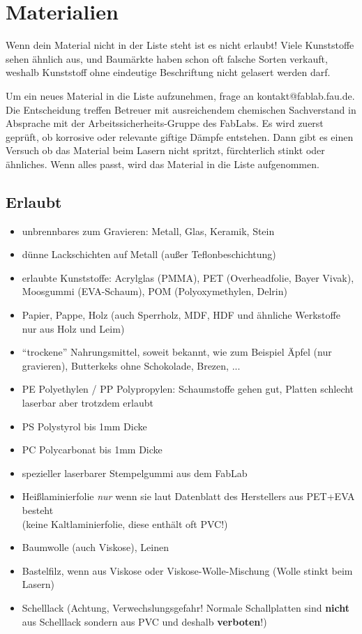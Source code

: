 \documentclass{\basedir/fablab-document}
\begin{document}
	\newpage %

	\section{Materialien}
	Wenn dein Material nicht in der Liste steht ist es nicht erlaubt! Viele Kunststoffe sehen ähnlich aus, und Baumärkte haben schon oft falsche Sorten verkauft, weshalb Kunststoff ohne eindeutige Beschriftung nicht gelasert werden darf.

	Um ein neues Material in die Liste aufzunehmen, frage an kontakt@fablab.fau.de. Die Entscheidung treffen Betreuer mit ausreichendem chemischen Sachverstand in Absprache mit der Arbeitssicherheits-Gruppe des FabLabs. Es wird zuerst geprüft, ob korrosive oder relevante giftige Dämpfe entstehen. Dann gibt es einen Versuch ob das Material beim Lasern nicht spritzt, fürchterlich stinkt oder ähnliches. Wenn alles passt, wird das Material in die Liste aufgenommen.

	\subsection{Erlaubt}
	\newcommand{\itemCheck}{\item[\checkmark]}
	\begin{itemize}
		\itemCheck unbrennbares zum Gravieren: Metall, Glas, Keramik, Stein
		\itemCheck dünne Lackschichten auf Metall (außer Teflonbeschichtung)
		\itemCheck erlaubte Kunststoffe: Acrylglas (PMMA), PET (Overheadfolie, Bayer Vivak), Moosgummi (EVA-Schaum), POM (Polyoxymethylen, Delrin)
		\itemCheck Papier, Pappe, Holz (auch Sperrholz, MDF, HDF und ähnliche Werkstoffe nur aus Holz und Leim)
		\itemCheck \enquote{trockene} Nahrungsmittel, soweit bekannt, wie zum Beispiel Äpfel (nur gravieren), Butterkeks ohne Schokolade, Brezen, ...
		\itemCheck PE Polyethylen / PP Polypropylen: Schaumstoffe gehen gut, Platten schlecht laserbar aber trotzdem erlaubt
		\itemCheck PS Polystyrol bis 1mm Dicke
		\itemCheck PC Polycarbonat bis 1mm Dicke
		\itemCheck spezieller laserbarer Stempelgummi aus dem FabLab
		\itemCheck Heißlaminierfolie \emph{nur} wenn sie laut Datenblatt des Herstellers aus PET+EVA besteht\\(keine Kaltlaminierfolie, diese enthält oft PVC!)
		\itemCheck Baumwolle (auch Viskose), Leinen
		\itemCheck Bastelfilz, wenn aus Viskose oder Viskose-Wolle-Mischung (Wolle stinkt beim Lasern)
		\itemCheck Schelllack (Achtung, Verwechslungsgefahr! Normale Schallplatten sind \textbf{nicht} aus Schelllack sondern aus PVC und deshalb \textbf{verboten}!)
	\end{itemize}
\end{document}

